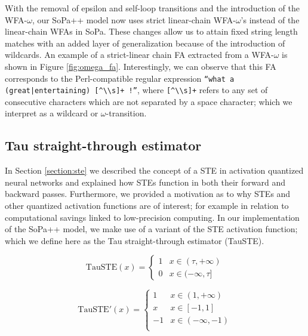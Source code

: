 With the removal of epsilon and self-loop transitions and the introduction of
the WFA-$\omega$, our SoPa++ model now uses strict linear-chain WFA-$\omega$'s
instead of the linear-chain WFAs in SoPa. These changes allow us to attain fixed
string length matches with an added layer of generalization because of the
introduction of wildcards. An example of a strict-linear chain FA extracted from
a WFA-$\omega$ is shown in Figure \ref{fig:omega_fa}. Interestingly, we can observe
that this FA corresponds to the Perl-compatible regular expression \texttt{``what a
  (great|entertaining) [\^{}\textbackslash\textbackslash s]+ !''}, where
\texttt{[\^{}\textbackslash\textbackslash s]+} refers to any set of consecutive
characters which are not separated by a space character; which we interpret as
a wildcard or $\omega$-transition.

\subsection{Tau straight-through estimator}

In Section \ref{section:ste} we described the concept of a STE in activation
quantized neural networks and explained how STEs function in both their forward
and backward passes. Furthermore, we provided a motivation as to why STEs and
other quantized activation functions are of interest; for example in relation to
computational savings linked to low-precision computing. In our implementation
of the SoPa++ model, we make use of a variant of the STE activation function;
which we define here as the Tau straight-through estimator (TauSTE).

\begin{equation}
  \label{eq:tau_ste_forward}
  \text{TauSTE}(x)=
  \begin{cases}
    1 & x \in (\tau, +\infty) \\
    0 & x \in (-\infty, \tau]
  \end{cases}
\end{equation}

\begin{equation}
  \label{eq:tau_ste_backward}
  \text{TauSTE}'(x)=
  \begin{cases}
    1 & x \in  (1, +\infty) \\
    x & x \in [-1, 1] \\
    -1 & x \in (-\infty, -1) \\
  \end{cases}
\end{equation}

